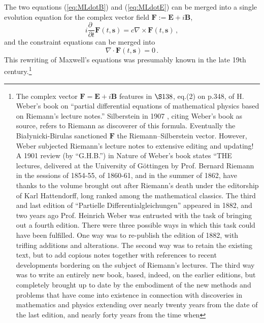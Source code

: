 \documentclass[12pt]{article}
\theoremstyle{definition}
\newcommand{\pddt}{\frac{\partial\phantom{t}}{\partial t}}
\newcommand{\vect}[1] {\boldsymbol{{ #1}} }
\newcommand{\sV}{{\vect{s}}}            %
\numberwithin{equation}{section}
\newcommand{\bB}{\mathbf{B}}
\newcommand{\bE}{\mathbf{E}}
\newcommand{\bF}{\mathbf{F}}
\newcommand{\nab}{\nabla}
\begin{document}
 The two equations (\ref{eq:MLdotB}) and (\ref{eq:MLdotE}) can be merged into a single evolution equation 
for the complex vector field $\bF := \bE +i\bB$,
\begin{equation}
\textstyle
 i \pddt{\bF(t,\sV)}
= \label{eq:MLdotF}
        c\nab\times\bF(t,\sV) \, ,
\end{equation}
and the constraint equations can be merged into
\begin{equation}
\textstyle
        \nab\cdot \bF(t,\sV)  
= \label{eq:MLdivF}
        0\, .
\end{equation}
 This rewriting of Maxwell's equations was presumably known in the late 19th century.\footnote{The complex 
   vector $\bF = \bE +i\bB$ features in ${\S138}$, eq.(2) on p.348, of H. Weber's book \cite{Weber} on ``partial differential 
   equations of mathematical physics based on Riemann's lecture notes.'' 
  Silberstein in 1907 \cite{SilberA,SilberB}, citing Weber's book as source, refers to Riemann as discoverer of this formula.
  Eventually the Bia{\l}ynicki-Birulas \cite{IBBZBBphotonREV} sanctioned $\bF$ the Riemann--Silberstein vector.
  However, Weber subjected Riemann's lecture notes to extensive editing and updating! 
  A 1901 review (by ``G.H.B.'') in Nature \cite{NatureBOOKreview} of Weber's book states 
    ``THE lectures, delivered at the University of G\"ottingen by Prof. Bernard Riemann in the sessions of 1854-55, of 
        1860-61, and in the summer of 1862, have thanks to the volume brought out after Riemann's death under the editorship 
        of Karl Hattendorff, long ranked among the mathematical classics. 
      The third and last edition of ``Partielle Differentialgleichungen'' appeared in 1882, and two years ago Prof. Heinrich 
        Weber was entrusted with the task of bringing out a fourth edition. 
      There were three possible ways in which this task could have been fulfilled. 
      One way was to re-publish the edition of 1882, with trifling additions and alterations. 
      The second way was to retain the existing text, but to add copious notes together with references to recent developments 
        bordering on the subject of Riemann’s lectures. 
      The third way was to write an entirely new book, based, indeed, on the earlier editions, but completely brought up to date 
        by the embodiment of the new methods and problems that have come into existence in connection with discoveries in mathematics 
        and physics extending over nearly twenty years from the date of the last edition, and nearly forty years from the time when 
}
\end{document}
